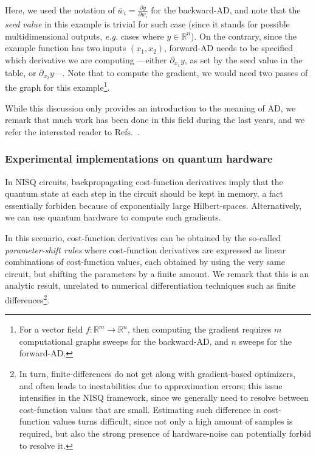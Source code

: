 Here, we used the notation of $\bar{w}_i=\frac{\partial y}{\partial w_i}$ for the backward-AD, and note that the \textit{seed value} in this example is trivial for such case (since it stands for possible multidimensional outputs, \textit{e.g.} cases where $y \in \mathbb{R}^n$). On the contrary, since the example function has two inputs $(x_1, x_2)$, forward-AD needs to be specified which derivative we are computing ---either $\partial_{x_1} y$, as set by the seed value in the table, or $\partial_{x_2} y$---. Note that to compute the gradient, we would need two passes of the graph for this example\footnote{For a vector field $f:\mathbb{R}^m\rightarrow \mathbb{R}^n$, then computing the gradient requires $m$
computational graphs sweeps for the backward-AD, and $n$ sweeps for the forward-AD.}.

While this discussion only provides an introduction to the meaning of AD, we remark that much work has been done in this field during the last years, and we refer the interested reader to Refs.~\cite{wikiAD,abadi2016tensorflow,maclaurinautograd,maclaurin2016phd,survey_ad}.

\subsubsection{Experimental implementations on quantum hardware}
In NISQ circuits, backpropagating cost-function derivatives imply that the quantum state at each step in the circuit should be kept in memory, a fact essentially forbiden because of exponentially large Hilbert-spaces. Alternatively, we can use quantum hardware to compute such gradients.

In this scenario, cost-function derivatives can be obtained by the so-called \textit{parameter-shift rules} where cost-function derivatives are expressed as linear combinations of cost-function values, each obtained by using the very same circuit, but shifting the parameters by a finite amount. We remark that this is an analytic result, unrelated to numerical differentiation techniques such as finite differences\footnote{In turn, finite-differences do not get along with gradient-based optimizers, and often leads to inestabilities due to approximation errors; this issue intensifies in the NISQ framework, since we generally need to resolve between cost-function values that are small. Estimating such difference in cost-function values turns difficult, since not only a high amount of samples is required, but also the strong presence of hardware-noise can potentially forbid to resolve it.}.

